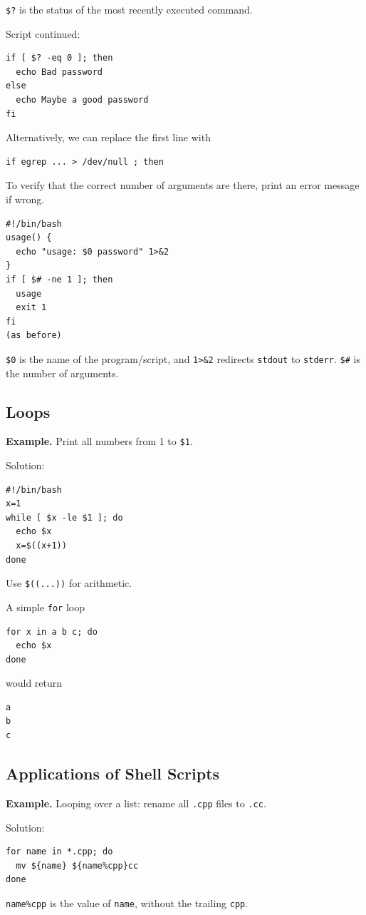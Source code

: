 \documentclass[11pt]{article}
\theoremstyle{definition}
\begin{document}
{\tt \$?} is the status of the most recently executed command.

Script continued:
\begin{verbatim}
if [ $? -eq 0 ]; then 
  echo Bad password 
else 
  echo Maybe a good password 
fi
\end{verbatim}

Alternatively, we can replace the first line with

\begin{verbatim} 
if egrep ... > /dev/null ; then
\end{verbatim}

To verify that the correct number of arguments are there, print an error message if wrong.
\begin{verbatim}
#!/bin/bash
usage() {
  echo "usage: $0 password" 1>&2
}
if [ $# -ne 1 ]; then
  usage
  exit 1
fi
(as before)
\end{verbatim}
{\tt \$0} is the name of the program/script, and {\tt 1>\&2} redirects {\tt stdout} to {\tt stderr}. {\tt \$\#} is the number of arguments. 

\subsection{Loops}
{\bf Example.} Print all numbers from 1 to {\tt \$1}. 

Solution: 
\begin{verbatim}
#!/bin/bash
x=1
while [ $x -le $1 ]; do
  echo $x
  x=$((x+1))
done
\end{verbatim}

Use {\tt \$((...))} for arithmetic.

A simple {\tt for} loop
\begin{verbatim}
for x in a b c; do
  echo $x
done
\end{verbatim}
would return
\begin{verbatim}
a
b
c
\end{verbatim}

\subsection{Applications of Shell Scripts}
{\bf Example.} Looping over a list: rename all {\tt .cpp} files to {\tt .cc}.

Solution:
\begin{verbatim} 
for name in *.cpp; do
  mv ${name} ${name%cpp}cc
done
\end{verbatim}

{\tt name\%cpp} is the value of {\tt name}, without the trailing {\tt cpp}.
\end{document}
